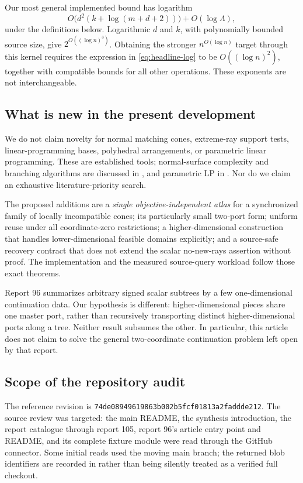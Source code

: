 \documentclass[11pt,a4paper]{article}
\theoremstyle{definition}
\theoremstyle{remark}
\newcommand{\pin}{\texttt{74de08949619863b002b5fcf01813a2faddde212}}
\begin{document}
Our most general implemented bound has logarithm
\begin{equation}
 O\bigl(d^2(k+\log(m+d+2))\bigr)+O(\log\Lambda),
 \label{eq:headline-log}
\end{equation}
under the definitions below. Logarithmic $d$ and $k$, with polynomially bounded source size, give $2^{O((\log n)^3)}$. Obtaining the stronger $n^{O(\log n)}$ target through this kernel requires the expression in \eqref{eq:headline-log} to be $O((\log n)^2)$, together with compatible bounds for all other operations. These exponents are not interchangeable.

\subsection{What is new in the present development}
We do not claim novelty for normal matching cones, extreme-ray support tests, linear-programming bases, polyhedral arrangements, or parametric linear programming. These are established tools; normal-surface complexity and branching algorithms are discussed in \cite{bo,bps}, and parametric LP in \cite{parametric}. Nor do we claim an exhaustive literature-priority search.

The proposed additions are a \emph{single objective-independent atlas} for a synchronized family of locally incompatible cones; its particularly small two-port form; uniform reuse under all coordinate-zero restrictions; a higher-dimensional construction that handles lower-dimensional feasible domains explicitly; and a source-safe recovery contract that does not extend the scalar no-new-rays assertion without proof. The implementation and the measured source-query workload follow those exact theorems.

Report 96 summarizes arbitrary signed scalar subtrees by a few one-dimensional continuation data. Our hypothesis is different: higher-dimensional pieces share one master port, rather than recursively transporting distinct higher-dimensional ports along a tree. Neither result subsumes the other. In particular, this article does not claim to solve the general two-coordinate continuation problem left open by that report.

\subsection{Scope of the repository audit}
The reference revision is \pin. The source review was targeted: the main README, the synthesis introduction, the report catalogue through report 105, report 96's article entry point and README, and its complete fixture module were read through the GitHub connector. Some initial reads used the moving main branch; the returned blob identifiers are recorded in  rather than being silently treated as a verified full checkout.
\end{document}
